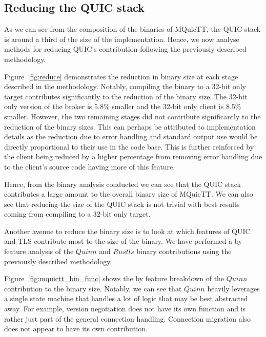 \subsection{Reducing the QUIC stack}

As we can see from the composition of the binaries of MQuicTT, the QUIC stack is around a third of the size of the implementation.
Hence, we now analyse methods for reducing QUIC's contribution following the previously described methodology.

Figure~\ref{fig:reduce} demonstrates the reduction in binary size at each stage described in the methodology.
Notably, compiling the binary to a 32-bit only target contributes significantly to the reduction of the binary size.
The 32-bit only version of the broker is $5.8\%$ smaller and the 32-bit only client is $8.5\%$ smaller.
However, the two remaining stages did not contribute significantly to the reduction of the binary sizes.
This can perhaps be attributed to implementation details as the reduction due to error handling and standard output use would be directly proportional to their use in the code base.
This is further reinforced by the client being reduced by a higher percentage from removing error handling due to the client's source code having more of this feature.

Hence, from the binary analysis conducted we can see that the QUIC stack contributes a large amount to the overall binary size of MQuicTT.
We can also see that reducing the size of the QUIC stack is not trivial with best results coming from compiling to a 32-bit only target.

Another avenue to reduce the binary size is to look at which features of QUIC and TLS contribute most to the size of the binary.
We have performed a by feature analysis of the $Quinn$ and $Rustls$ binary contributions using the previously described methodology.

Figure~\ref{fig:mquictt_bin_func} shows the by feature breakdown of the $Quinn$ contribution to the binary size.
Notably, we can see that $Quinn$ heavily leverages a single state machine that handles a lot of logic that may be best abstracted away.
For example, version negotiation does not have its own function and is rather just part of the general connection handling.
Connection migration also does not appear to have its own contribution.


